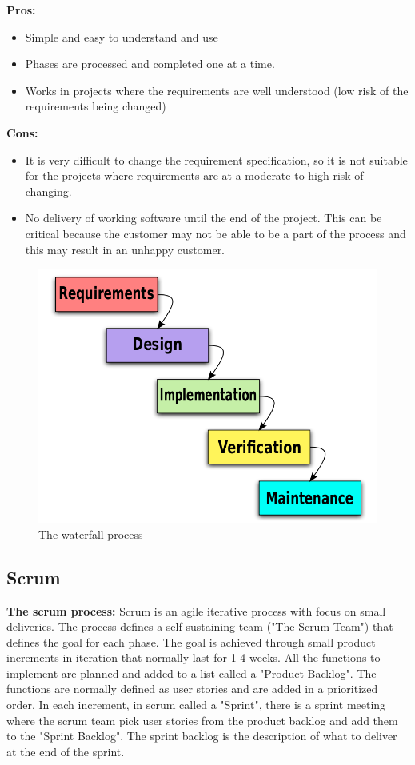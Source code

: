 {\bf Pros: }
\begin{itemize}
	\item Simple and easy to understand and use
	\item Phases are processed and completed one at a time.
	\item Works in projects where the requirements are well understood (low risk of the requirements being changed)
\end{itemize}
\clearpage
{\bf Cons: }
\begin{itemize}
	\item It is very difficult to change the requirement specification, so it is not suitable for the projects where requirements are at a moderate to high risk of changing.
	\item No delivery of working software until the end of the project. This can be critical because the customer may not
	be able to be a part of the process and this may result in an unhappy customer.
\end{itemize}

\begin{figure}[!ht]
\centering
\includegraphics[scale=0.3]{pictures/Waterfall_model.png}
\caption{The waterfall process}
\label{overflow}
\end{figure}


\subsection{Scrum}
{\bf The scrum process: }\cite{wikiScrum} Scrum is an agile iterative process with focus on small deliveries. The process
defines a self-sustaining team ("The Scrum Team") that defines the goal for each phase. The goal 
is achieved through small product increments in iteration that normally last for 1-4 weeks. 
All the functions to implement are planned and added to a list called a "Product Backlog". The
functions are normally defined as user stories and are added in a prioritized order. In each increment, 
in scrum called a "Sprint", there is a sprint meeting where the scrum team pick user stories from the 
product backlog and add them to the "Sprint Backlog". The sprint backlog is the description of what 
to deliver at the end of the sprint.

